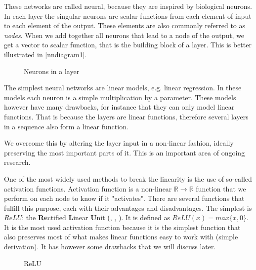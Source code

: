 These networks are called neural, because they are inspired by biological neurons. In each layer the singular neurons are scalar functions from each element of input to each element of the output. These elements are also commonly referred to as \textit{nodes}. When we add together all neurons that lead to a node of the output, we get a vector to scalar function, that is the building block of a layer. This is better illustrated in \autoref{nndiagram1}.

\begin{figure}[h]
\center
\caption{Neurons in a layer}
\label{nndiagram1}
\medskip
{}
\end{figure}	

The simplest neural networks are linear models, e.g. linear regression. In these models each neuron is a simple multiplication by a parameter. These models   however have many drawbacks, for instance that they can only model linear functions. That is because the layers are linear functions, therefore several layers in a sequence also form a linear function.

We overcome this by altering the layer input in a non-linear fashion, ideally preserving the most important parts of it. This is an important area of ongoing research.

One of the most widely used methods to break the linearity is the use of so-called activation functions. Activation function is a non-linear $\mathbb{R}\rightarrow \mathbb{R}$ function that we perform on each node to know if it "activates". There are several functions that fulfill this purpose, each with their advantages and disadvantages. The simplest is $ReLU$: the \textbf{Re}ctified \textbf{L}inear \textbf{U}nit (\cite{relu1}, \cite{relu2}, \cite{relu3}). It is defined as $ReLU(x)=max\{x,0\}$. It is the most used activation function because it is the simplest function that also preserves most of what makes linear functions easy to work with (simple derivation). It has however some drawbacks that we will discuss later.

\begin{figure}[h]
\caption{ReLU}
\center
{}
\end{figure}

